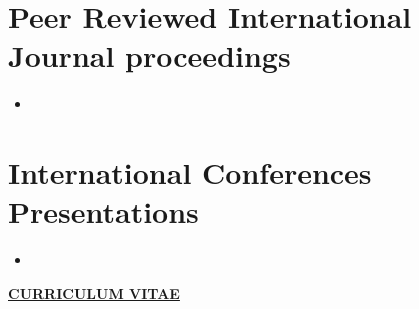 \documentclass[12pt, twoside,openright]{report}
\begin{document}
\section*{Peer Reviewed International Journal proceedings}
\begin{itemize}
    \item
\end{itemize}

\section*{International Conferences Presentations}
\begin{itemize}
    \item  
\end{itemize}


\newpage
\thispagestyle{empty}
\mbox{}


\newpage
\clearpage
\thispagestyle{empty}
\phantom{a}


\begin{center}
\large \underline{\textbf{CURRICULUM VITAE}}
\end{center}
\vspace*{0.1in}

\end{document}
